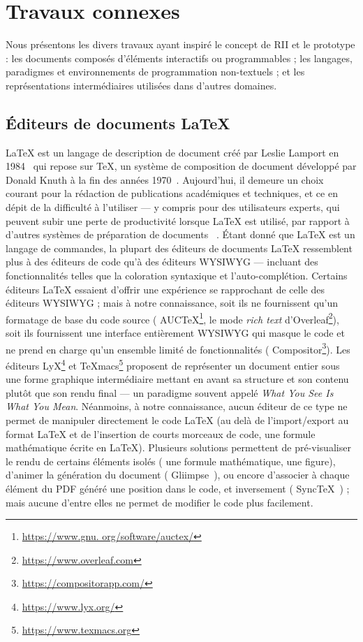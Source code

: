 \section{Travaux connexes}
\label{sec:travaux-connexes}

Nous présentons les divers travaux ayant inspiré le concept de RII et le prototype \iLaTeX{} : les documents composés d'éléments interactifs ou programmables ; les langages, paradigmes et environnements de programmation non-textuels ; et les représentations intermédiaires utilisées dans d'autres domaines.


\subsection{Éditeurs de documents \LaTeX{}}

\LaTeX{} est un langage de description de document créé par Leslie Lamport en 1984~\cite{lamport1994latex} qui repose sur \TeX{}, un système de composition de document développé par Donald Knuth à la fin des années 1970~\cite{knuth1984texbook}.
Aujourd'hui, il demeure un choix courant pour la rédaction de publications académiques et techniques, et ce en dépit de la difficulté à l'utiliser --- y compris pour des utilisateurs experts, qui peuvent \og subir une perte de productivité lorsque \LaTeX{} est utilisé, par rapport à d'autres systèmes de préparation de{} documents \fg~\cite{knauff2014efficiency}.
Étant donné que \LaTeX{} est un langage de commandes, la plupart des éditeurs de documents \LaTeX{} ressemblent plus à des éditeurs de code qu'à des éditeurs WYSIWYG --- incluant des fonctionnalités telles que la coloration syntaxique et l'auto-complétion.
Certains éditeurs \LaTeX{} essaient d'offrir une expérience se rapprochant de celle des éditeurs WYSIWYG ; mais à notre connaissance, soit ils ne fournissent qu'un formatage de base du code source (\eg{} AUC\TeX{}\footnote{\url{https://www.gnu. org/software/auctex/}}, le mode \emph{rich text} d'Overleaf\footnote{\url{https://www.overleaf.com}}), soit ils fournissent une interface entièrement WYSIWYG qui masque le code et ne prend en charge qu'un ensemble limité de fonctionnalités (\eg{} Compositor\footnote{\url{https://compositorapp.com/}}).
Les éditeurs LyX\footnote{\url{https://www.lyx.org/}} et TeXmacs\footnote{\url{https://www.texmacs.org}} proposent de représenter un document entier sous une forme graphique intermédiaire mettant en avant sa structure et son contenu plutôt que son rendu final --- un paradigme souvent appelé \emph{What You See Is What You Mean}.
Néanmoins, à notre connaissance, aucun éditeur de ce type ne permet de manipuler directement le code \LaTeX{} (au delà de l'import/export au format \LaTeX{} et de l'insertion de courts morceaux de code, \eg{} une formule mathématique écrite en \LaTeX{}).
Plusieurs solutions permettent de pré-visualiser le rendu de certains éléments isolés (\eg{} une formule mathématique, une figure), d'animer la génération du document (\eg{} Gliimpse~\cite{dragicevic2011gliimpse}), ou encore d'associer à chaque élément du PDF généré une position dans le code, et inversement (\eg{} SyncTeX~\cite{laurens2008direct}) ; mais aucune d'entre elles ne permet de modifier le code plus facilement.

